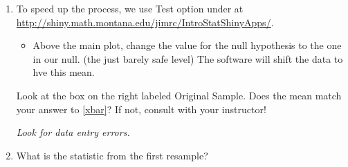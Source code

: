 \begin{enumerate}
\begin{enumerate}





\end{enumerate}
\item To speed up the process, we use  {\sf Test} option under
   at
  \url{http://shiny.math.montana.edu/jimrc/IntroStatShinyApps/}. 

  \begin{itemize}
    \item Above the main plot, change the value for the null
      hypothesis to the one in our null.  (the just barely safe level)
      The software will shift the data to hve this mean.
   \end{itemize}

    Look at the box on the right labeled {\sf Original Sample}.
       Does the mean match your answer to \ref{xbar}?  If not, consult
       with your instructor! 
\begin{students}
  \vspace{1cm}
\end{students}

\begin{key}
  {\it Look for data entry errors. }
\end{key}

\item   What is the statistic from the first  resample?
\begin{students}
  \vspace{1cm}
\end{students}


\end{enumerate}

